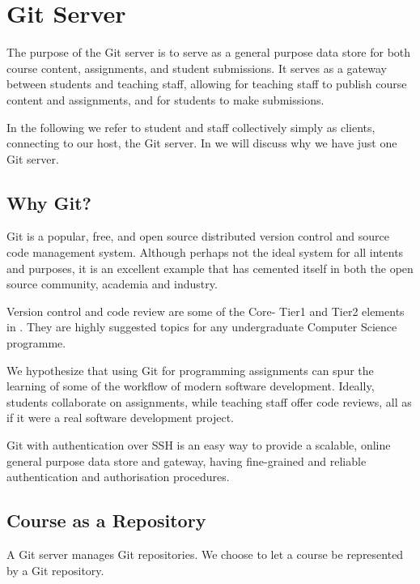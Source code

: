 
\section{Git Server}

The purpose of the Git server is to serve as a general purpose data store for
both course content, assignments, and student submissions. It serves as a
gateway between students and teaching staff, allowing for teaching staff to
publish course content and assignments, and for students to make submissions.

In the following we refer to student and staff collectively simply as clients,
connecting to our host, the Git server. In
 we will discuss why we have just one
Git server.

\subsection{Why Git?}

Git is a popular\cite{ohloh-2014}, free, and open source distributed version
control and source code management system\cite{git-2014}. Although perhaps not
the ideal system for all intents and purposes, it is an excellent example that
has cemented itself in both the open source community, academia and
industry\cite{gitprojects-2014}.

Version control and code review are some of the Core- Tier1 and Tier2 elements
in \cite{cs-curricula-2013}. They are highly suggested topics for any
undergraduate Computer Science programme.

We hypothesize that using Git for programming assignments can spur the learning
of some of the workflow of modern software development. Ideally, students
collaborate on assignments, while teaching staff offer code reviews, all as if
it were a real software development project.

Git with authentication over SSH is an easy way to provide a scalable, online
general purpose data store and gateway, having fine-grained and reliable
authentication and authorisation procedures.

\subsection{Course as a Repository}

A Git server manages Git repositories. We choose to let a course be represented
by a Git repository.

